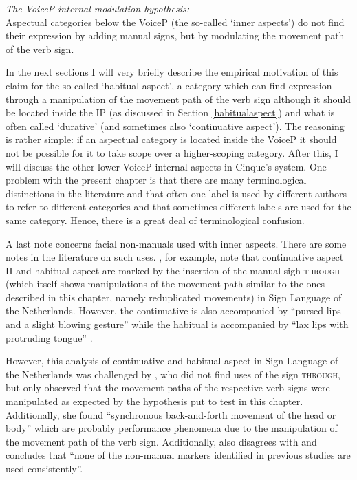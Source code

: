 \begin{exe}
\ex \textit{The VoiceP-internal modulation hypothesis:}\\
Aspectual categories below the VoiceP (the so-called `inner aspects') do not find their expression by adding manual signs, but by modulating the movement path of the verb sign. \label{vpinternalmodhypa}
\end{exe}


\noindent In the next sections I will very briefly describe the empirical motivation of this claim for the so-called `habitual aspect', a category which can find expression through a manipulation of the movement path of the verb sign although it should be located inside the IP (as discussed in Section \ref{habitualaspect}) and what is often called `durative' (and sometimes also `continuative aspect'). The reasoning is rather simple: if an aspectual category is located inside the VoiceP it should not be possible for it to take scope over a higher-scoping category. After this, I will discuss the other lower VoiceP-internal aspects in Cinque's system. One problem with the present chapter is that there are many terminological distinctions in the literature and that often one label is used by different authors to refer to different categories and that sometimes different labels are used for the same category. Hence, there is a great deal of terminological confusion. 

A last note concerns facial non-manuals used with inner aspects. There are some notes in the literature on such uses. \citet{hoitingslobin2001typological}, for example, note that continuative aspect II and habitual aspect are marked by the insertion of the manual sigh \textsc{through} (which itself shows manipulations of the movement path similar to the ones described in this chapter, namely reduplicated movements) in Sign Language of the Netherlands. However, the continuative is also accompanied by ``pursed lips and a slight blowing gesture'' while the habitual is accompanied by ``lax lips with protruding tongue'' \citep[127]{hoitingslobin2001typological}. 

However, this analysis of continuative and habitual aspect in Sign Language of the Netherlands was challenged by \citet{oomen2016aspectual}, who did not find uses of the sign \textsc{through}, but only observed that the movement paths of the respective verb signs were manipulated as expected by the hypothesis put to test in this chapter. Additionally, she found ``synchronous back-and-forth movement of the head or body'' \citep[43]{oomen2016aspectual} which are probably performance phenomena due to the manipulation of the movement path of the verb sign. Additionally, \citet[17]{boven2018throughaspect} also disagrees with \citet{hoitingslobin2001typological} and concludes that ``none of the non-manual markers identified in previous studies are  used  consistently''.%


